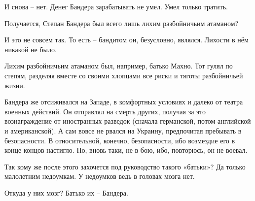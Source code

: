 И снова – нет. Денег Бандера зарабатывать не умел. Умел только тратить.

Получается, Степан Бандера был всего лишь лихим разбойничьим атаманом? 

И это не совсем так. То есть – бандитом он, безусловно, являлся. Лихости в нём
никакой не было.

Лихим разбойничьим атаманом был, например, батько Махно. Тот гулял по степям,
разделяя вместе со своими хлопцами все риски и тяготы разбойничьей жизни. 

Бандера же отсиживался на Западе, в комфортных условиях и далеко от театра
военных действий. Он отправлял на смерть других, получая за это вознаграждение
от иностранных разведок (сначала германской, потом английской и американской).
А сам вовсе не рвался на Украину, предпочитая пребывать в безопасности. В
относительной, конечно, безопасности, ибо возмездие его в конце концов
настигло. Но, вновь-таки, не в бою, ибо, повторюсь, он не воевал.

Так кому же после этого захочется под руководство такого «батьки»? Да только
малолетним недоумкам. У недоумков ведь в головах мозга нет. 

Откуда у них мозг? Батько их – Бандера.

